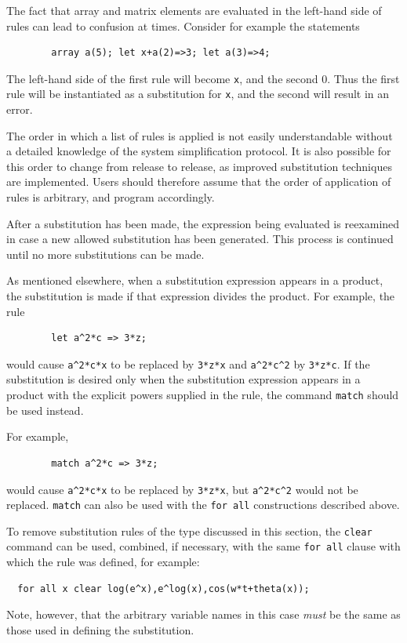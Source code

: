 The fact that array and matrix elements are evaluated in the left-hand side
of rules can lead to confusion at times. Consider for example the
statements
\begin{verbatim}
        array a(5); let x+a(2)=>3; let a(3)=>4;
\end{verbatim}
The left-hand side of the first rule will become \texttt{x}, and the second
0.  Thus the first rule will be instantiated as a substitution for
\texttt{x}, and the second will result in an error.

The order in which a list of rules is applied is not easily understandable
without a detailed knowledge of the system simplification protocol. It is
also possible for this order to change from release to release, as improved
substitution techniques are implemented. Users should therefore assume
that the order of application of rules is arbitrary, and program
accordingly.

After a substitution has been made, the expression being evaluated is
reexamined in case a new allowed substitution has been generated. This
process is continued until no more substitutions can be made.

\hypertarget{command:MATCH}{}
As mentioned elsewhere, when a substitution expression appears in a
product, the substitution is made if that expression divides the product.
For example, the rule
\begin{verbatim}
        let a^2*c => 3*z;
\end{verbatim}
would cause \texttt{a\textasciicircum 2*c*x} to be replaced by \texttt{3*z*x} and
\texttt{a\textasciicircum 2*c\textasciicircum 2} by \texttt{3*z*c}.  If the substitution is desired only
when the substitution expression appears in a product with the explicit
powers supplied in the rule, the command \texttt{match} should be used
instead.

For example,
\begin{verbatim}
        match a^2*c => 3*z;
\end{verbatim}
would cause \texttt{a\textasciicircum 2*c*x} to be replaced by \texttt{3*z*x}, but
\texttt{a\textasciicircum 2*c\textasciicircum 2} would not be replaced. \texttt{match} can also be used
with the \texttt{for all} constructions described above.

To remove substitution rules of the type discussed in this section, the
\texttt{clear} command can be used, combined, if necessary,
with the same \texttt{for all} clause with which the rule was defined, for
example:
\begin{verbatim}
  for all x clear log(e^x),e^log(x),cos(w*t+theta(x));
\end{verbatim}
Note, however, that the arbitrary variable names in this case \emph{must}
be the same as those used in defining the substitution.

